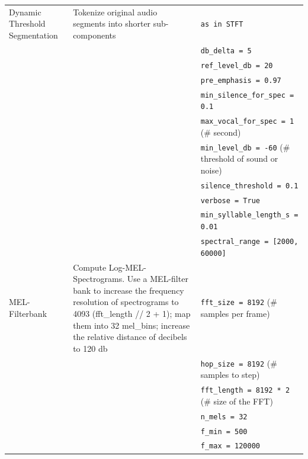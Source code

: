 \documentclass[11pt]{article}
\begin{document}
\begin{table}[htbp]
{\begin{tabular}{p{3cm}p{6cm}p{3cm}}
\addlinespace[0.2cm]
Dynamic Threshold Segmentation & Tokenize original audio segments into shorter sub-components & \texttt{as in STFT} \\
                               & & \texttt{db\_delta = 5} \\
                               & & \texttt{ref\_level\_db = 20} \\
                               & & \texttt{pre\_emphasis = 0.97} \\
                               & & \texttt{min\_silence\_for\_spec = 0.1} \\
                               & & \texttt{max\_vocal\_for\_spec = 1} \quad (\# second) \\
                               & & \texttt{min\_level\_db = -60} \quad (\# threshold of sound or noise) \\
                               & & \texttt{silence\_threshold = 0.1} \\
                               & & \texttt{verbose = True} \\
                               & & \texttt{min\_syllable\_length\_s = 0.01} \\
                               & & \texttt{spectral\_range = [2000, 60000]} \\
\addlinespace[0.2cm]
MEL-Filterbank & Compute Log-MEL-Spectrograms. Use a MEL-filter bank to increase the frequency resolution of spectrograms to 4093 (fft\_length // 2 + 1); map them into 32 mel\_bins; increase the relative distance of decibels to 120 db & \texttt{fft\_size = 8192} \quad (\# samples per frame) \\
               & & \texttt{hop\_size = 8192} \quad (\# samples to step) \\
               & & \texttt{fft\_length = 8192 * 2} \quad (\# size of the FFT) \\
               & & \texttt{n\_mels = 32} \\
               & & \texttt{f\_min = 500} \\
               & & \texttt{f\_max = 120000} \\
\bottomrule
\end{tabular}
}
\end{table}
\end{document}
